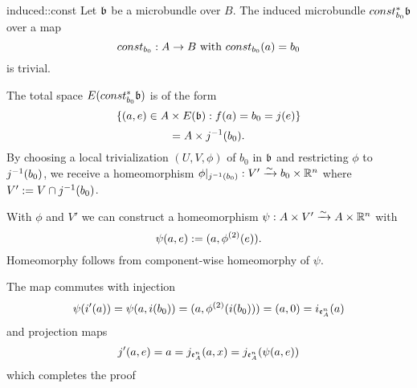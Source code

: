 \begin{mylemma}{induced::const}
    Let $\mathfrak{b}$ be a microbundle over $B$. The induced microbundle $const_{b_0}^*\mathfrak{b}$ over a map
    \[ const_{b_0}: A \to B \text{ with } const_{b_0}(a) = b_0 \]
    is trivial.
\end{mylemma}

\begin{myproof}
    The total space $E(const_{b_0}^*\mathfrak{b})$ is of the form
    \[ \{(a, e) \in A \times E(\mathfrak{b}):f(a) = b_0 = j(e)\} \]
    \[ = A \times j^{-1}(b_0). \]
    By choosing a local trivialization $(U, V, \phi)$ of $b_0$ in $\mathfrak{b}$ and restricting $\phi$ to $j^{-1}(b_0)$,
    we receive a homeomorphism $\phi\vert_{j^{-1}(b_0)}: V' \xrightarrow{\sim} b_0 \times \mathbb{R}^n$ where $V' := V \cap j^{-1}(b_0)$.
    
    With $\phi$ and $V'$ we can construct a homeomorphism $\psi: A \times V' \xrightarrow{\sim} A \times \mathbb{R}^n$ with
    \[ \psi(a, e) := (a, \phi^{(2)}(e)). \]
    Homeomorphy follows from component-wise homeomorphy of $\psi$.

    The map commutes with injection
    \[ \psi(i'(a)) = \psi(a, i(b_0)) = (a, \phi^{(2)}(i(b_0))) = (a, 0) = i_{\mathfrak{e}^{n}_A}(a) \]
    and projection maps
    \[ j'(a, e) = a = j_{\mathfrak{e}^{n}_A}(a, x) = j_{\mathfrak{e}^{n}_A}(\psi(a, e)) \]
    which completes the proof
\end{myproof}